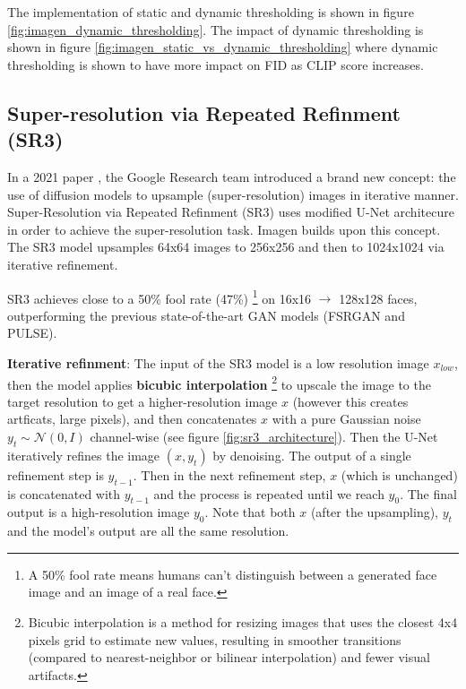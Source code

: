 The implementation of static and dynamic thresholding is shown in figure \ref{fig:imagen_dynamic_thresholding}. The impact of dynamic thresholding is shown in figure \ref{fig:imagen_static_vs_dynamic_thresholding} where dynamic thresholding is shown to have more impact on FID as CLIP score increases.
















\subsection{Super-resolution via Repeated Refinment (SR3)}

\label{subsec:imagen_sr3}

In a 2021 paper \cite{sr3}, the Google Research team introduced a brand new concept: the use of diffusion models to upsample (super-resolution) images in iterative manner. Super-Resolution via Repeated Refinment (SR3) uses modified U-Net architecure in order to achieve the super-resolution task. Imagen builds upon this concept. The SR3 model upsamples 64x64 images to 256x256 and then to 1024x1024 via iterative refinement.

SR3 achieves close to a 50\% fool rate (47\%) \footnote{A 50\% fool rate means humans can't distinguish between a generated face image and an image of a real face.} on 16x16 $\rightarrow$ 128x128 faces, outperforming the previous state-of-the-art GAN models (FSRGAN and PULSE).

\textbf{Iterative refinment}: The input of the SR3 model is a low resolution image $x_{low}$, then the model applies \textbf{bicubic interpolation} \footnote{Bicubic interpolation is a method for resizing images that uses the closest 4x4 pixels grid to estimate new values, resulting in smoother transitions (compared to nearest-neighbor or bilinear interpolation) and fewer visual artifacts.} to upscale the image to the target resolution to get a higher-resolution image $x$ (however this creates artficats, large pixels), and then concatenates $x$ with a pure Gaussian noise $y_t \sim \mathcal{N} (0, I)$ channel-wise (see figure \ref{fig:sr3_architecture}). Then the U-Net iteratively refines the image $(x, y_t)$ by denoising. The output of a single refinement step is $y_{t-1}$. Then in the next refinement step, $x$ (which is unchanged) is concatenated with $y_{t-1}$ and the process is repeated until we reach $y_0$. The final output is a high-resolution image $y_0$. Note that both $x$ (after the upsampling), $y_t$ and the model's output are all the same resolution.

